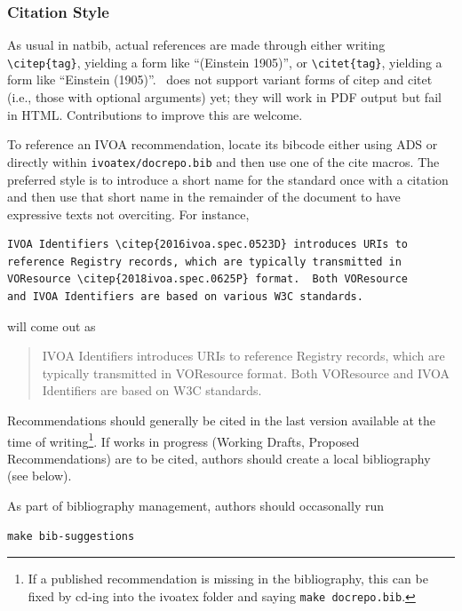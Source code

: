 \documentclass[11pt,a4paper]{ivoa}
\begin{document}
\subsubsection{Citation Style}
\label{sect:citation}

As usual in natbib, actual references are made through either writing
\verb|\citep{tag}|, yielding a form like ``(Einstein 1905)'',
or \verb|\citet{tag}|, yielding a form like ``Einstein (1905)''.
\ivoatex\ does not support variant forms of citep and citet (i.e., those
with optional arguments) yet; they will work in PDF output but fail in
HTML.  Contributions to improve this are welcome.

To reference an IVOA recommendation, locate its bibcode either using ADS
or directly within \texttt{ivoatex/docrepo.bib} and then use one of the
cite macros.  The preferred style is to introduce a short name for the
standard once with a citation and then use that short name in the
remainder of the document to have expressive texts not overciting. For
instance,

\begin{lstlisting}
IVOA Identifiers \citep{2016ivoa.spec.0523D} introduces URIs to
reference Registry records, which are typically transmitted in
VOResource \citep{2018ivoa.spec.0625P} format.  Both VOResource
and IVOA Identifiers are based on various W3C standards.
\end{lstlisting}

will come out as

\begin{quotation}
IVOA Identifiers \citep{2016ivoa.spec.0523D} introduces URIs to
reference Registry records, which are typically transmitted in
VOResource \citep{2018ivoa.spec.0625P} format.  Both VOResource and IVOA
Identifiers are based on W3C standards.
\end{quotation}

Recommendations should generally be cited in the last version available
at the time of writing\footnote{If a published recommendation is missing
in the bibliography, this can be fixed by cd-ing into the ivoatex folder
and saying \texttt{make docrepo.bib}.}.  If works in progress (Working
Drafts, Proposed Recommendations) are to be cited, authors should create
a local bibliography (see below).

As part of bibliography management, authors should occasonally run

\begin{lstlisting}
make bib-suggestions
\end{lstlisting}
\end{document}
